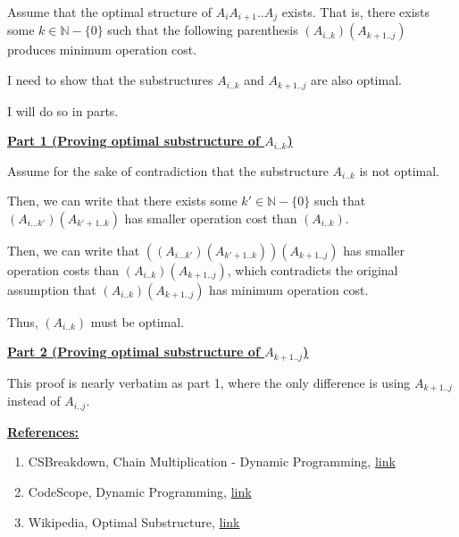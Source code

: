 \documentclass[12pt]{article}
\begin{document}
\begin{enumerate}[1.]
\begin{itemize}
        \begin{mdframed}
        Assume that the optimal structure of $A_iA_{i+1}..A_j$ exists. That is,
        there exists some $k \in \mathbb{N} - \{0\}$ such that the following parenthesis $(A_{i..k})(A_{k+1..j})$
        produces minimum operation cost.

        \bigskip

        I need to show that the substructures $A_{i..k}$ and $A_{k+1..j}$ are also optimal.

        \bigskip

        I will do so in parts.

        \bigskip

        \underline{\textbf{Part 1 (Proving optimal substructure of $A_{i..k}$)}}

        \bigskip

        Assume for the sake of contradiction that the substructure $A_{i..k}$ is
        not optimal.

        \bigskip

        Then, we can write that there exists some $k' \in \mathbb{N} - \{0\}$ such that
        $(A_{i...k'})(A_{k'+1..k})$ has smaller operation cost than $(A_{i..k})$.

        \bigskip

        Then, we can write that $((A_{i...k'})(A_{k'+1..k}))(A_{k+1..j})$ has smaller
        operation costs than $(A_{i..k})(A_{k+1..j})$, which contradicts the original assumption that
        $(A_{i..k})(A_{k+1..j})$ has minimum operation cost.

        \bigskip

        Thus, $(A_{i..k})$ must be optimal.


        \bigskip

        \underline{\textbf{Part 2 (Proving optimal substructure of $A_{k+1..j}$)}}

        \bigskip

        This proof is nearly verbatim as part 1, where the only difference is using $A_{k+1..j}$
        instead of $A_{i..j}$.

        \end{mdframed}
    \end{itemize}

    \bigskip

    \underline{\textbf{References:}}

    \bigskip

    \begin{enumerate}[1)]
        \item CSBreakdown, Chain Multiplication - Dynamic Programming, \href{https://www.youtube.com/watch?v=GMzVeWpyTN0}{link}
        \item CodeScope, Dynamic Programming, \href{https://www.codesdope.com/course/algorithms-dynamic-programming/}{link}
        \item Wikipedia, Optimal Substructure, \href{https://en.wikipedia.org/wiki/Optimal_substructure}{link}
    \end{enumerate}


\end{enumerate}
\end{document}
